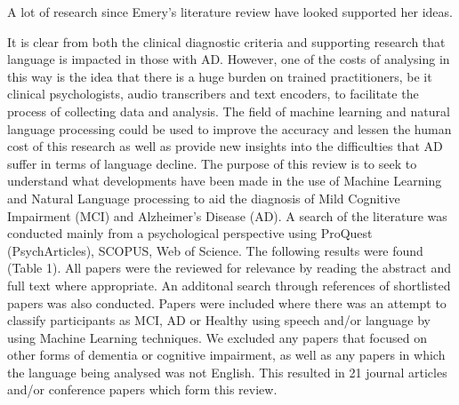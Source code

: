 \documentclass[a4paper]{article}
\begin{document}
\par
A lot of research since Emery's literature review \cite{Emery2000} have looked supported her ideas. \newline
\par
It is clear from both the clinical diagnostic criteria and supporting research that language is impacted in those with AD. However, one of the costs of analysing in this way is the idea that there is a huge burden on trained practitioners, be it clinical psychologists, audio transcribers and text encoders, to facilitate the process of collecting data and analysis. The field of machine learning and natural language processing could be used to improve the accuracy and lessen the human cost of this research as well as provide new insights into the difficulties that AD suffer in terms of language decline.  
The purpose of this review is to seek to understand what developments have been made in the use of Machine Learning and Natural Language processing to aid the diagnosis of Mild Cognitive Impairment (MCI) and Alzheimer's Disease (AD). A search of the literature was conducted mainly from a psychological perspective using ProQuest (PsychArticles), SCOPUS, Web of Science. The following results were found (Table 1). All papers were the reviewed for relevance by reading the abstract and full text where appropriate. An additonal search through references of shortlisted papers was also conducted. Papers were included where there was an attempt to classify participants as MCI, AD or Healthy using speech and/or language by using Machine Learning techniques. We excluded any papers that focused on other forms of dementia or cognitive impairment, as well as any papers in which the language being analysed was not English. This resulted in 21 journal articles and/or conference papers which form this review.
\end{document}
